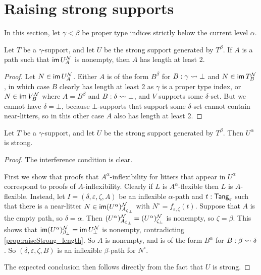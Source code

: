 \section{Raising strong supports}
In this section, let \( \gamma < \beta \) be proper type indices strictly below the current level \( \alpha \).
\begin{proposition}
  \label{prop:raiseStrong_length}
  Let \( T \) be a \( \gamma \)-support, and let \( U \) be the strong support generated by \( T^\beta \).
  If \( A \) is a path such that \( \operatorname{\mathsf{im}} U_A^{\mathcal N} \) is nonempty, then \( A \) has length at least 2.
\end{proposition}
\begin{proof}
  Let \( N \in \operatorname{\mathsf{im}} U_A^{\mathcal N} \).
  Either \( A \) is of the form \( B^\beta \) for \( B : \gamma \rightsquigarrow \bot \) and \( N \in \operatorname{\mathsf{im}} T_B^{\mathcal N} \), in which case \( B \) clearly has length at least 2 as \( \gamma \) is a proper type index, or \( N \in \operatorname{\mathsf{im}} V_B^{\mathcal N} \) where \( A = B^\beta \) and \( B : \delta \rightsquigarrow \bot \), and \( V \) supports some \( \delta \)-set.
  But we cannot have \( \delta = \bot \), because \( \bot \)-supports that support some \( \delta \)-set cannot contain near-litters, so in this other case \( A \) also has length at least 2.
\end{proof}
\begin{proposition}
  \label{prop:raiseStrong}
  Let \( T \) be a \( \gamma \)-support, and let \( U \) be the strong support generated by \( T^\beta \).
  Then \( U^\alpha \) is strong.
\end{proposition}
\begin{proof}
  The interference condition is clear.

  First we show that proofs that \( A^\alpha \)-inflexibility for litters that appear in \( U^\alpha \) correspond to proofs of \( A \)-inflexibility.
  Clearly if \( L \) is \( A^\alpha \)-flexible then \( L \) is \( A \)-flexible.
  Instead, let \( I = (\delta, \varepsilon, \zeta, A) \) be an inflexible \( \alpha \)-path and \( t : \mathsf{Tang}_\varepsilon \) such that there is a near-litter \( N \in \operatorname{\mathsf{im}} (U^\alpha)^{\mathcal N}_{{A_\zeta}_\bot} \) with \( N^\circ = f_{\varepsilon,\zeta}(t) \).
  Suppose that \( A \) is the empty path, so \( \delta = \alpha \).
  Then \( (U^\alpha)^{\mathcal N}_{{A_\zeta}_\bot} = (U^\alpha)^{\mathcal N}_{\zeta_\bot} \) is nonempty, so \( \zeta = \beta \).
  This shows that \( \operatorname{\mathsf{im}} (U^\alpha)^{\mathcal N}_{\beta_\bot} = \operatorname{\mathsf{im}} U^{\mathcal N}_\bot \) is nonempty, contradicting \cref{prop:raiseStrong_length}.
  So \( A \) is nonempty, and is of the form \( B^\alpha \) for \( B : \beta \rightsquigarrow \delta \).
  So \( (\delta,\varepsilon,\zeta,B) \) is an inflexible \( \beta \)-path for \( N^\circ \).

  The expected conclusion then follows directly from the fact that \( U \) is strong.
\end{proof}
